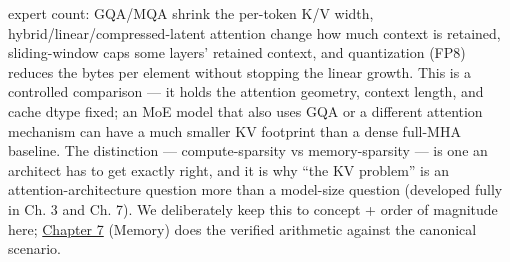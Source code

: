 expert count: GQA/MQA shrink the per-token K/V width,
hybrid/linear/compressed-latent attention change how much context is
retained, sliding-window caps some layers' retained context, and
quantization (FP8) reduces the bytes per element without stopping the
linear growth. This is a controlled comparison --- it holds the
attention geometry, context length, and cache dtype fixed; an MoE model
that also uses GQA or a different attention mechanism can have a much
smaller KV footprint than a dense full-MHA baseline. The distinction ---
compute-sparsity vs memory-sparsity --- is one an architect has to get
exactly right, and it is why ``the KV problem'' is an
attention-architecture question more than a model-size question
(developed fully in Ch. 3 and Ch. 7). We deliberately keep this to
concept + order of magnitude here; \hyperref[chap:7]{Chapter 7} (Memory) does the verified
arithmetic against the canonical scenario.

